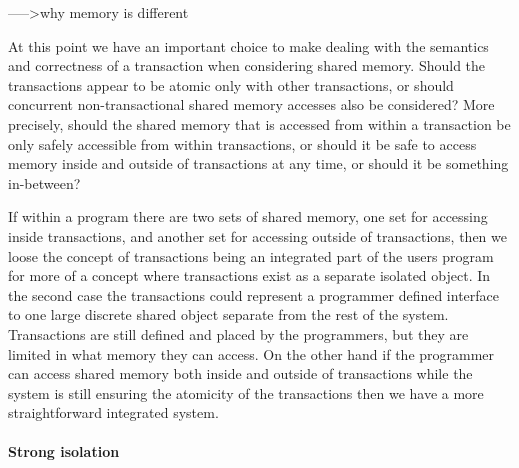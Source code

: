 ----->why memory is different

At this point we have an important choice to make dealing with the
semantics and correctness of a transaction when considering shared memory.
Should the transactions appear to be atomic only with other transactions, or should
concurrent non-transactional shared memory accesses also be considered?
More precisely, should the shared memory that is accessed from within a transaction
be only safely accessible from within transactions, or should it be
safe to access memory inside and outside of transactions at any time,
or should it be something in-between?

If within a program there are two sets of shared memory, one set for accessing inside
transactions, and another set for accessing outside of transactions, then we loose 
the concept of transactions being an integrated part of the users program for more of a
concept where transactions exist as a separate isolated object.
In the second case the transactions could represent a programmer defined
interface to one large discrete shared object separate from the rest of the system.
Transactions are still defined and placed by the programmers, but they are limited
in what memory they can access.
On the other hand if the programmer can access shared memory both inside and outside
of transactions while the system is still ensuring the atomicity of the transactions then
we have a more straightforward integrated system.



\paragraph{Strong isolation}

